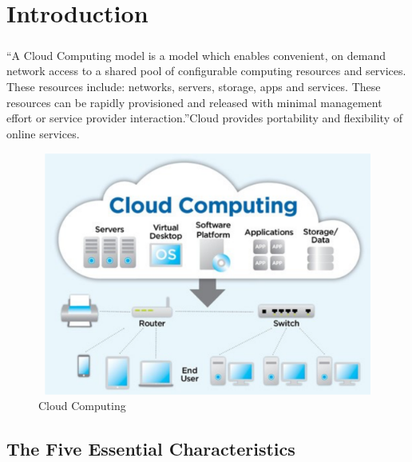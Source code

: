 \chapter{Introduction}

\paragraph{\hspace{24pt}}
“A Cloud Computing model is a model which enables convenient, on demand network access to a shared pool of configurable computing resources and services. These resources include: networks, servers, storage, apps and services. These resources can be rapidly provisioned and released with minimal management effort or service provider interaction.”Cloud provides portability and flexibility of online services.


\begin{figure}[htb]
\centering
\includegraphics[width=12cm,height=8cm]{5-contents/1-Introduction/images/cloud-computing-intro.png} %
\caption{Cloud Computing}
\label{fig:label} %
\end{figure}

\section{The Five Essential Characteristics}
